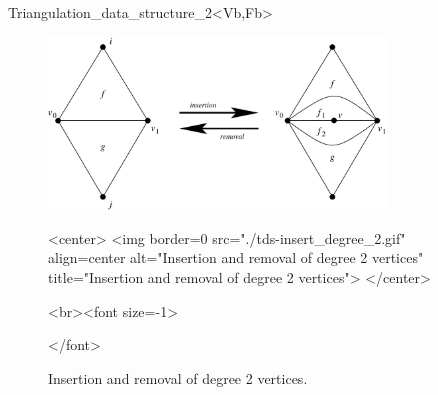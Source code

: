 \begin{ccRefClass}{Triangulation_data_structure_2<Vb,Fb>}
\begin{figure}[htb]
\begin{ccTexOnly}
\begin{center}
\includegraphics[width=0.8\textwidth]{TDS_2_ref/tds-insert_degree_2}
\end{center}
\end{ccTexOnly}
\begin{ccHtmlOnly}
<center>
<img border=0 src="./tds-insert_degree_2.gif" align=center
alt="Insertion and removal of degree 2 vertices"
title="Insertion and removal of degree 2 vertices">
</center>
\end{ccHtmlOnly}
\begin{ccHtmlOnly}
<br><font size=-1>
\end{ccHtmlOnly}
\caption{Insertion and removal of degree 2 vertices.}
\label{fig-tds-ir-deg2}
\begin{ccHtmlOnly}
</font>
\end{ccHtmlOnly}
\end{figure}



\end{ccRefClass}


